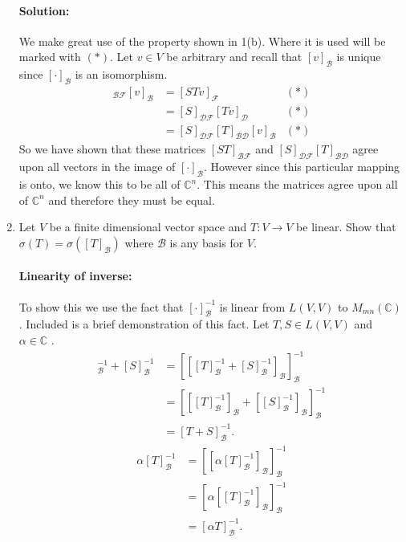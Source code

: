 \documentclass{article}
\begin{document}
\begin{enumerate}
      \paragraph{Solution: } 
      We make great use of the property shown in 1(b). Where it is used will be marked with $(*)$. Let $v\in V$ be arbitrary and recall that $[v]_{\mathcal{B}}$ is unique since $[\cdot ]_\mathcal{B}$ is an isomorphism. 
      \begin{align*}
          [ST]_{\mathcal{B}\mathcal{F}}[v]_\mathcal{B}&= [STv]_\mathcal{F}&(*) \\
                                              &= [S]_{\mathcal{D}\mathcal{F}}[Tv]_{\mathcal{D}}&(*) \\
                                              &= [S]_{\mathcal{D}\mathcal{F}}[T]_{\mathcal{B}\mathcal{D}}[v]_\mathcal{B}&(*) 
      \end{align*}
      So we have shown that these matrices $[ST]_{\mathcal{B}\mathcal{F}}$ and  $[S]_{\mathcal{DF}}[T]_{\mathcal{B}\mathcal{D}} $ agree upon all vectors in the image of $[\cdot ]_\mathcal{B}$. However since this particular mapping is onto, we know this to be all of  $\mathbb{C}^{n}$. This means the matrices agree upon all of $\mathbb{C}^{n}$ and therefore they must be equal. 
  \item Let $V$ be a finite dimensional vector space and $T : V \to V$ be linear. Show that $\sigma(T)=\sigma([T]_{\mathcal{B}})$ where $\mathcal{B}$ is any basis for $V$.
      \paragraph{Linearity of inverse:} To show this we use the fact that $[\cdot ]_\mathcal{B}^{-1}$ is linear from $L(V,V)$ to $M_{mn}(\mathbb{C})$. Included is a brief demonstration of this fact. 
      Let $T,S\in L(V,V)$ and $\alpha\in \mathbb{C}$ .
      \begin{align*}
          [T]_\mathcal{B}^{-1}+[S]_{\mathcal{B}}^{-1}&=
          [[[T]_\mathcal{B}^{-1}+[S]_{\mathcal{B}}^{-1}]_\mathcal{B}]_\mathcal{B}^{-1}\\
         &=[[[T]_\mathcal{B}^{-1}]_\mathcal{B}+[[S]_{\mathcal{B}}^{-1}]_\mathcal{B}]_\mathcal{B}^{-1}\\
         &=[T+S]_\mathcal{B}^{-1}
      .\end{align*}
      \begin{align*}
          \alpha[T]_\mathcal{B}^{-1}&= [[\alpha[T]_\mathcal{B}^{-1}]_\mathcal{B}]_\mathcal{B}^{-1} \\ 
                                    &= [\alpha[[T]_\mathcal{B}^{-1}]_\mathcal{B}]_\mathcal{B}^{-1} \\ 
                                    &= [\alpha T]_\mathcal{B}^{-1} 
      .\end{align*}

\end{enumerate}
\end{document}
